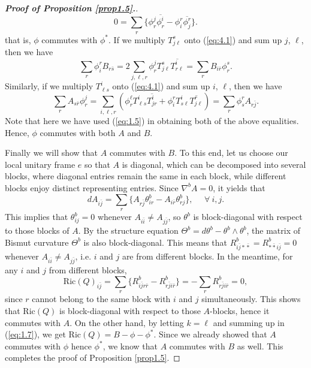 \documentclass[10pt,a4paper]{amsart}
\begin{document}
\begin{proof}[{\bf Proof of Proposition \ref{prop1.5}.}]
$$ 0 = \sum_r \{ \phi^j_r \overline{\phi^i_r } - \phi^r_i \overline{\phi^r_j } \} .$$
that is, $\phi$ commutes with $\phi^{\ast}$. If we multiply $T^s_{j\ell }$ onto (\ref{eq:4.1}) and sum up $j$, $\ell$,
then we have \[\sum_r \phi_i^r B_{r\bar{s}} = 2 \sum_{j,\ell,r} \phi^j_r T^s_{j \ell} \overline{T^i_{r \ell}}
=\sum_{r} B_{i\bar{r}} \phi_r^s.\]
Similarly, if we multiply $T^i_{\ell s}$ onto (\ref{eq:4.1}) and sum up $i$, $\ell$, then we have
\[\sum_r A_{s\bar{r}}\phi_r^j
=\sum_{i,\ell,r}(\phi^{\ell}_r T^i_{\ell s} \overline{T^i_{jr}} + \phi_i^r T^i_{s \ell}\overline{T^r_{j \ell}})
=\sum_r \phi_s^r A_{r \bar{j}}.\]
Note that here we have used (\ref{eq:1.5}) in obtaining  both of the above equalities. Hence, $\phi$ commutes with both $A$ and $B$.

Finally we will show that $A$ commutes with $B$.
To this end, let us choose our local unitary frame $e$ so that $A$ is diagonal, which can be decomposed into
several blocks, where diagonal entries remain the same in each block, while different blocks enjoy distinct representing entries.
Since $\nabla^b A=0$, it yields that
$$ d A_{i\bar{j}} = \sum_r \{  A_{r\bar{j}} \theta^b_{ir} - A_{i\bar{r}} \theta^b_{rj} \} , \ \ \ \ \ \ \forall \  i,j. $$
This implies that $\theta^b_{ij}=0$ whenever $A_{i\bar{i}} \neq A_{j\bar{j}}$,
so $\theta^b$ is block-diagonal with respect to those blocks of $A$.
By the structure equation $\Theta^b=d\theta^b - \theta^b\wedge \theta^b$,
the matrix of Bismut curvature $\Theta^b$ is also block-diagonal.
This means that $R^b_{i\bar{j}\ast \bar{\ast}} = R^b_{\ast \bar{\ast}i\bar{j}} =0$
whenever $A_{i\bar{i}} \neq A_{j\bar{j}}$, i.e. $i$ and $j$ are from different blocks.
In the meantime, for any $i$ and $j$ from different blocks,
$$ \mathrm{Ric}(Q)_{i \bar{j}} = \sum_r \big\{ R^b_{i\bar{j}r\bar{r}} - R^b_{r\bar{j}i\bar{r}} \big\} = - \sum_r R^b_{r\bar{j}i\bar{r}} =0,$$
since $r$ cannot belong to the same block with $i$ and $j$ simultaneously.
This shows that $\mathrm{Ric}(Q)$ is block-diagonal with respect to those $A$-blocks, hence it commutes with $A$.
On the other hand, by letting $k=\ell$ and summing up in (\ref{eq:1.7}), we get $\mathrm{Ric}(Q)=B-\phi -\phi^{\ast}$.
Since we already showed that $A$ commutes with $\phi$ hence $\phi^{\ast}$, we know that $A$ commutes with $B$ as well.
This completes the proof of Proposition \ref{prop1.5}.
\end{proof}
\end{document}
